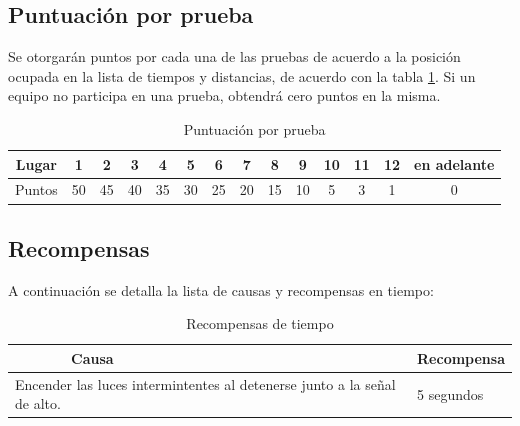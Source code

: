 \documentclass[letterpaper,12pt]{article}
\begin{document}
\subsection{Puntuación por prueba}
\label{sec:scoring}
Se otorgarán puntos por cada una de las pruebas de acuerdo a la posición ocupada en la lista de tiempos y distancias, de acuerdo con la tabla \ref{tab:Scoring}. Si un equipo no participa en una prueba, obtendrá cero puntos en la misma.
\[\]
\begin{table}[h!] 
  \centering
  \begin{tabular}{|c|c|c|c|c|c|c|c|c|c|c|c|c|c|}
    \hline
    Lugar &    1&   2&   3&   4&   5&   6&   7&   8&   9&10 & 11 & 12 & en adelante\\
    \hline
    Puntos & 50 & 45 & 40 & 35 & 30 & 25 & 20 & 15 & 10 & 5 & 3 & 1 & 0\\
    \hline
  \end{tabular}
  \caption{Puntuación por prueba}
  \label{tab:Scoring}
\end{table}

\subsection{Recompensas}
\label{sec:bonuses}
A continuación se detalla la lista de causas y recompensas en tiempo:
\begin{table}[h!]
  \centering
  \begin{tabular}{|p{}|p{}|}
    \hline
    $\qquad\qquad$Causa & Recompensa\\
    \hline
    Encender las luces intermintentes al detenerse junto a la señal de alto. & 5 segundos\\
    \hline
  \end{tabular}
  \caption{Recompensas de tiempo}
  \label{tab:bonuses}
\end{table}
\end{document}
